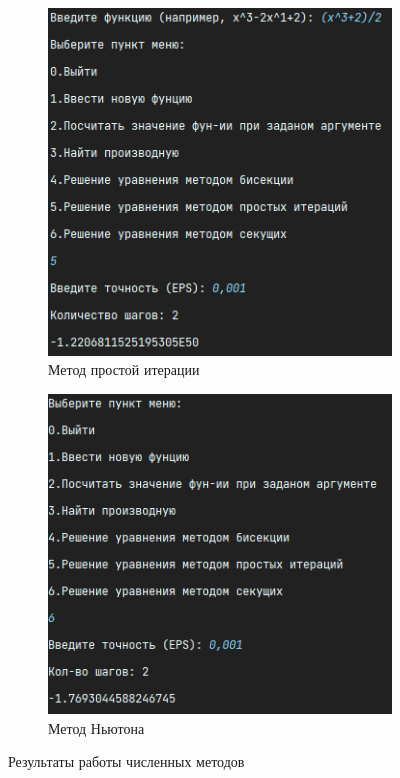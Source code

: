 \documentclass[12pt]{article}
\begin{document}
\begin{figure}
\begin{subfigure}{0.4\textwidth}
            \includegraphics[width=\textwidth]{image/simple_iteration_method}
            \caption{Метод простой итерации}
        \end{subfigure}
        \hfill
        \begin{subfigure}{0.4\textwidth}
            \centering
            \includegraphics[width=\textwidth]{image/newton_method}
            \caption{Метод Ньютона}
        \end{subfigure}
        \caption{Результаты работы численных методов}
    \end{figure}
\end{document}
